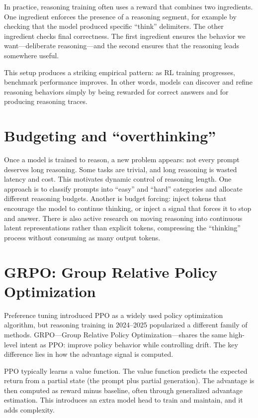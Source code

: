In practice, reasoning training often uses a reward that combines two ingredients. One ingredient enforces the presence of a reasoning segment, for example by checking that the model produced specific “think” delimiters. The other ingredient checks final correctness. The first ingredient ensures the behavior we want—deliberate reasoning—and the second ensures that the reasoning leads somewhere useful.

This setup produces a striking empirical pattern: as RL training progresses, benchmark performance improves. In other words, models can discover and refine reasoning behaviors simply by being rewarded for correct answers and for producing reasoning traces.

\section{Budgeting and “overthinking”}
Once a model is trained to reason, a new problem appears: not every prompt deserves long reasoning. Some tasks are trivial, and long reasoning is wasted latency and cost. This motivates dynamic control of reasoning length. One approach is to classify prompts into “easy” and “hard” categories and allocate different reasoning budgets. Another is budget forcing: inject tokens that encourage the model to continue thinking, or inject a signal that forces it to stop and answer. There is also active research on moving reasoning into continuous latent representations rather than explicit tokens, compressing the “thinking” process without consuming as many output tokens.

\section{GRPO: Group Relative Policy Optimization}
Preference tuning introduced PPO as a widely used policy optimization algorithm, but reasoning training in 2024--2025 popularized a different family of methods. GRPO—Group Relative Policy Optimization—shares the same high-level intent as PPO: improve policy behavior while controlling drift. The key difference lies in how the advantage signal is computed.

PPO typically learns a value function. The value function predicts the expected return from a partial state (the prompt plus partial generation). The advantage is then computed as reward minus baseline, often through generalized advantage estimation. This introduces an extra model head to train and maintain, and it adds complexity.

